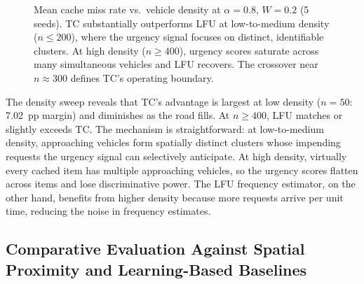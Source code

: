 \documentclass[preprint,12pt]{elsarticle}
\begin{document}
	\begin{figure}[t]
		\centering
		\caption{Mean cache miss rate vs.\ vehicle density at $\alpha=0.8$, $W=0.2$ (5 seeds). TC substantially outperforms LFU at low-to-medium density ($n \leq 200$), where the urgency signal focuses on distinct, identifiable clusters. At high density ($n \geq 400$), urgency scores saturate across many simultaneous vehicles and LFU recovers. The crossover near $n \approx 300$ defines TC's operating boundary.}
		\label{fig:density}
	\end{figure}
	
	The density sweep reveals that TC's advantage is largest at low density ($n = 50$: 7.02~pp margin) and diminishes as the road fills. At $n \geq 400$, LFU matches or slightly exceeds TC. The mechanism is straightforward: at low-to-medium density, approaching vehicles form spatially distinct clusters whose impending requests the urgency signal can selectively anticipate. At high density, virtually every cached item has multiple approaching vehicles, so the urgency scores flatten across items and lose discriminative power. The LFU frequency estimator, on the other hand, benefits from higher density because more requests arrive per unit time, reducing the noise in frequency estimates.

	\subsection{Comparative Evaluation Against Spatial Proximity and Learning-Based Baselines}
	
\end{document}
